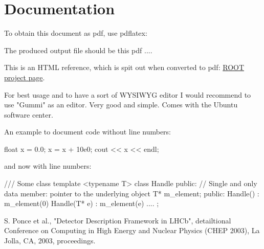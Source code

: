\documentclass[10pt,a4paper]{article}
\begin{document}
\section{Documentation}
\label{sec:aida2020-section-documentation}
To obtain this document as pdf, use pdflatex:
The produced output file should be this pdf ....

\noindent
This is an HTML reference, which is spit out when converted to pdf: 
\href{http://root.cern.ch}{ROOT project page}.


For best usage and to have a sort of WYSIWYG editor I would recommend to use
"Gummi" as an editor. Very good and simple. Comes with the Ubuntu software center.


An example to document code without line numbers:
\begin{unnumberedcode}
   float x = 0.0;
   x = x + 10e0;
   cout << x << endl;
\end{unnumberedcode}


and now with line numbers:
\begin{code}    /// Some class
    template <typename T> class Handle  {
    public:
          // Single and only data member: pointer to the underlying object  
          T* m_element;
    public:
          Handle() : m_element(0)                  {                                     }
          Handle(T* e) : m_element(e)              {                                     }
          ....
    };
\end{code}

\newpage
\begin{thebibliography}{9}
 S. Ponce et al., 
                "Detector Description Framework in LHCb", 
                detailtional Conference on Computing in High Energy and Nuclear Physics  (CHEP 2003), 
                La Jolla, CA, 2003, proceedings. 
\end{thebibliography}
\end{document}
